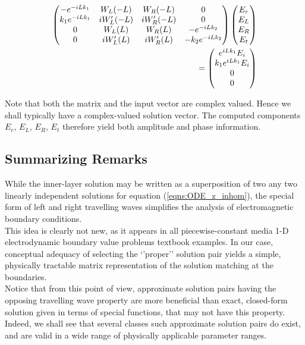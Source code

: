 \documentclass[twocolumn,secnumarabic,amssymb, nobibnotes, aps, prd]{revtex4-1}
\begin{document}
\begin{align}
\label{eqns:BC_mat_sys}
\begin{pmatrix}
-e^{-i L k_1 } & W_L(-L) & W_R(-L) & 0 \\
k_1 e^{-i L k_1} & i W_L'(-L) & i W_R'(-L) & 0 \\
0 & W_L(L) & W_R(L) & -e^{-i L k_2} \\
0 & i W'_L(L) & i W'_R(L) & -k_2 e^{-i L k_2} 
\end{pmatrix}
\begin{pmatrix}
E_r \\ E_L \\ E_R \\ E_t
\end{pmatrix} \notag \\= 
\begin{pmatrix}
e^{i L k_1} E_i \\ k_1 e^{i L k_1} E_i \\ 0 \\ 0  
\end{pmatrix}
\end{align}

Note that both the matrix and the input vector are complex valued. Hence we shall typically have a complex-valued solution vector. The computed components $E_r$, $E_L$, $E_R$, $E_t$ therefore yield both amplitude and phase information.

\subsection{Summarizing Remarks}
While the inner-layer solution may be written as a superposition of two any two linearly independent solutions for equation (\ref{eqns:ODE_z_inhom}), the special form of left and right travelling waves simplifies the analysis of electromagnetic boundary conditions. \\
This idea is clearly not new, as it appears in all piecewise-constant media 1-D electrodynamic boundary value problems textbook examples. In our case, conceptual adequacy of selecting the `'proper'' solution pair yields a simple, physically tractable matrix representation 
of the solution matching at the boundaries. \\
Notice that from this point of view, approximate solution pairs having the opposing travelling wave property are more beneficial than exact, closed-form solution given in terms of special functions, that may not have this property.\\
Indeed, we shall see that several classes such approximate solution pairs do exist, and are valid in a wide range of physically applicable parameter ranges.
\end{document}
